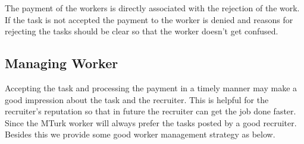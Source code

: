 \documentclass[11pt]{article}
\begin{document}
The payment of the workers is directly associated with the rejection of the work. If the task is not accepted the payment to the worker is denied and reasons for rejecting the tasks should be clear so that the worker doesn't get confused.



\subsection{Managing Worker} Accepting the task and processing the payment in a timely manner may make a good impression about the task and the recruiter. This is helpful for the recruiter's reputation so that in future the recruiter can get the job done faster. Since the MTurk worker will always  prefer the tasks posted by a good recruiter. Besides this we provide some good worker management strategy as below.
\end{document}
